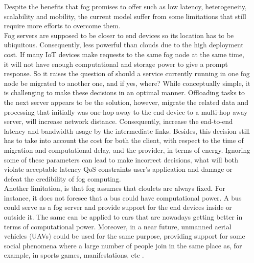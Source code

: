 \noindent\tab Despite the benefits that fog promises to offer such as low latency, heterogeneity, scalability and mobility, the current model suffer from some limitations that still require more efforts to overcome them.\\
\noindent\tab Fog servers are supposed to be closer to end devices so its location has to be ubiquitous. Consequently, less powerful than clouds due to the high deployment cost. If many IoT devices make requests to the same fog node at the same time, it will not have enough computational and storage power to give a prompt response. So it raises the question of should a service currently running in one fog node be migrated to another one, and if yes, where? While conceptually simple, it is challenging to make these decisions in an optimal manner. Offloading tasks to the next server appears to be the solution, however, migrate the related data and processing that initially was one-hop away to the end device to a multi-hop away server, will increase network distance. Consequently, increase the end-to-end latency and bandwidth usage by the intermediate links. Besides, this decision still has to take into account the cost for both the client, with respect to the time of migration and computational delay, and the provider, in terms of energy. Ignoring some of these parameters can lead to make incorrect decisions, what will both violate acceptable latency QoS constraints user's application and damage or defeat the credibility of fog computing.\\
\noindent\tab Another limitation, is that fog assumes that cloulets are always fixed. For instance, it does not foresee that a bus could have computational power. A bus could serve as a fog server and provide support for the end devices inside or outside it. The same can be applied to cars that are nowadays getting better in terms of computational power. Moreover, in a near future, unmanned aerial vehicles (UAVs) could be used for the same purpose, providing support for some social phenomena where a large number of people join in the same place as, for example, in sports games, manifestations, etc \cite{jeong2018mobile}.\\
